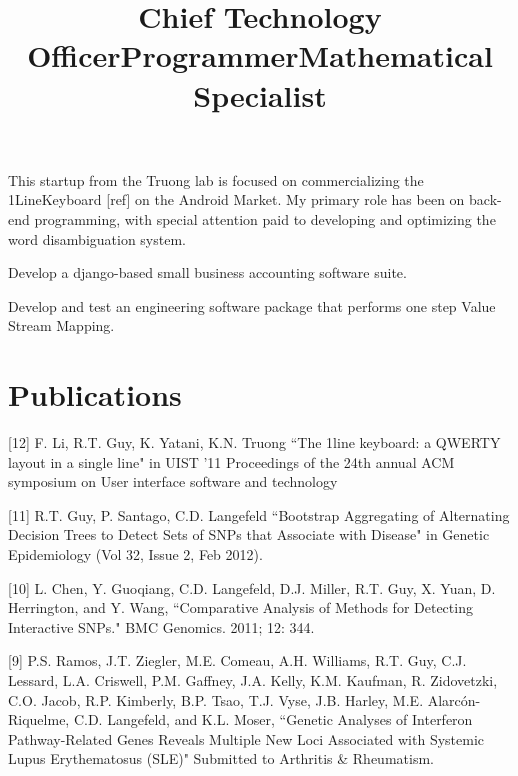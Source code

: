 \documentclass[overlapped,line,letterpaper]{res}
\begin{document}
\begin{resume}
 \title{Chief Technology Officer}
 \begin{position}
  This startup from the Truong lab is focused on commercializing the 1LineKeyboard [ref] on the Android Market. My primary role has been on back-end programming, with special attention paid to developing and optimizing the word disambiguation system. 
 \end{position}

 \title{Programmer}
 \begin{position}
   Develop a django-based small business accounting software suite. 
 \end{position}

 \title{Mathematical Specialist}
 \begin{position}
    Develop and test an engineering software package that performs one step Value Stream Mapping.
 \end{position}



\section{\bf Publications}

[12] F. Li, R.T. Guy, K. Yatani, K.N. Truong ``The 1line keyboard: a QWERTY layout in a single line" in UIST '11 Proceedings of the 24th annual ACM symposium on User interface software and technology

[11] R.T. Guy, P. Santago, C.D. Langefeld ``Bootstrap Aggregating of Alternating Decision Trees to Detect Sets of SNPs that Associate with Disease" in Genetic Epidemiology (Vol 32, Issue 2, Feb 2012). 

[10] L. Chen, Y. Guoqiang, C.D. Langefeld, D.J. Miller, R.T. Guy, X. Yuan, D. Herrington, and Y. Wang, ``Comparative Analysis of Methods for Detecting Interactive SNPs." BMC Genomics. 2011; 12: 344. 

[9] P.S. Ramos, J.T. Ziegler, M.E. Comeau, A.H. Williams, R.T. Guy, C.J. Lessard, L.A. Criswell, P.M. Gaffney, J.A. Kelly, K.M. Kaufman, R. Zidovetzki, C.O. Jacob, R.P. Kimberly, B.P. Tsao, T.J. Vyse, J.B. Harley, M.E. Alarc\'{o}n-Riquelme, C.D. Langefeld, and K.L. Moser, ``Genetic Analyses of Interferon Pathway-Related Genes Reveals Multiple New Loci Associated with Systemic Lupus Erythematosus (SLE)"  Submitted to Arthritis \& Rheumatism.


\end{resume}
\end{document}
